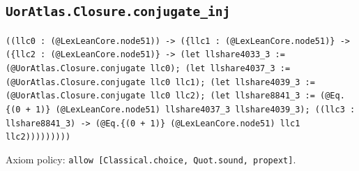 \documentclass[11pt]{article}
\begin{document}
\subsection*{\texttt{UorAtlas.Closure.conjugate\_inj}}
\noindent\texttt{((llc0 : (@LexLeanCore.node51)) -> (\{llc1 : (@LexLeanCore.node51)\} -> (\{llc2 : (@LexLeanCore.node51)\} -> (let llshare4033\_3 := (@UorAtlas.Closure.conjugate llc0); (let llshare4037\_3 := (@UorAtlas.Closure.conjugate llc0 llc1); (let llshare4039\_3 := (@UorAtlas.Closure.conjugate llc0 llc2); (let llshare8841\_3 := (@Eq.\{(0 + 1)\} (@LexLeanCore.node51) llshare4037\_3 llshare4039\_3); ((llc3 : llshare8841\_3) -> (@Eq.\{(0 + 1)\} (@LexLeanCore.node51) llc1 llc2)))))))))}\par
\noindent Axiom policy: \texttt{allow [Classical.choice, Quot.sound, propext]}.\par
\end{document}
